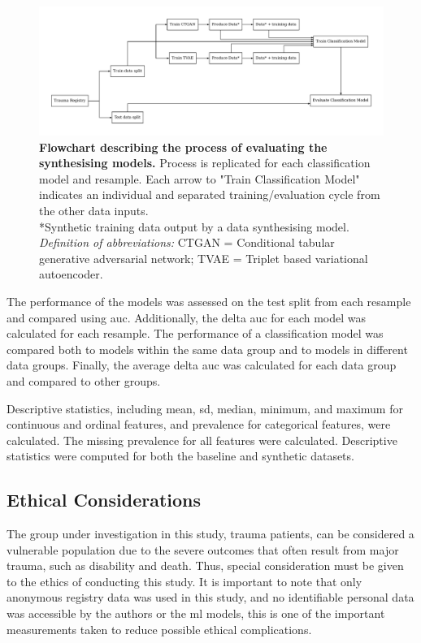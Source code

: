 \documentclass[12pt, a4paper]{article}
\begin{document}
\begin{figure}
    \centering
    \includegraphics[width=\textwidth]{figures/model_flowchart.pdf}
    \caption{\textbf{Flowchart describing the process of evaluating the synthesising models.} Process is replicated for each classification model and resample. Each arrow to "Train Classification Model" indicates an individual and separated training/evaluation cycle from the other data inputs.\\
        *Synthetic training data output by a data synthesising model.\\
        \textit{Definition of abbreviations:} CTGAN = Conditional tabular generative adversarial network; TVAE = Triplet based variational autoencoder.}
    \label{fig:modelflowchart}
\end{figure}

The performance of the models was assessed on the test split from each resample and compared using \acrshort{auc}. Additionally, the delta \acrshort{auc} for each model was calculated for each resample. The performance of a classification model was compared both to models within the same data group and to models in different data groups. Finally, the average delta \acrshort{auc} was calculated for each data group and compared to other groups.

Descriptive statistics, including mean, \acrfull{sd}, median, minimum, and maximum for continuous and ordinal features, and prevalence for categorical features, were calculated. The missing prevalence for all features were calculated. Descriptive statistics were computed for both the baseline and synthetic datasets.

\subsection{Ethical Considerations}
The group under investigation in this study, trauma patients, can be considered a vulnerable population due to the severe outcomes that often result from major trauma, such as disability and death. Thus, special consideration must be given to the ethics of conducting this study. It is important to note that only anonymous registry data was used in this study, and no identifiable personal data was accessible by the authors or the \acrshort{ml} models, this is one of the important measurements taken to reduce possible ethical complications.
\end{document}
